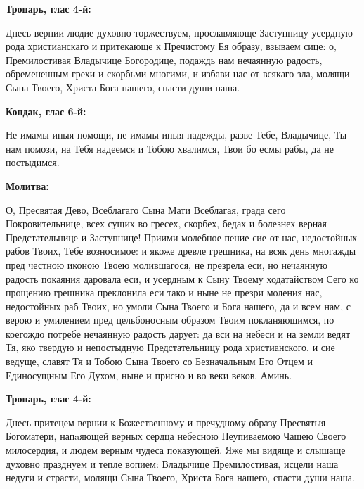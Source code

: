 \bigskip\bigskip\mychapterending

 


\bfseries Тропарь, глас 4-й\normalfont{}:


Днесь вернии людие духовно торжествуем, прославляюще Заступницу усердную рода христианскаго и притекающе к Пречистому Ея образу, взываем сице: о, Премилостивая Владычице Богородице, подаждь нам нечаянную радость, обремененным грехи и скорбьми многими, и избави нас от всякаго зла, молящи Сына Твоего, Христа Бога нашего, спасти души наша.


\medskip


\bfseries Кондак, глас 6-й\normalfont{}:


Не имамы иныя помощи, не имамы иныя надежды, разве Тебе, Владычице, Ты нам помози, на Тебя надеемся и Тобою хвалимся, Твои бо есмы рабы, да не постыдимся.


\medskip


\bfseries Молитва\normalfont{}:


О, Пресвятая Дево, Всеблагаго Сына Мати Всеблагая, града сего Покровительнице, всех сущих во гресех, скорбех, бедах и болезнех верная Предстательнице и Заступнице! Приими молебное пение сие от нас, недостойных рабов Твоих, Тебе возносимое: и якоже древле грешника, на всяк день многажды пред честною иконою Твоею молившагося, не презрела еси, но нечаянную радость покаяния даровала еси, и усердным к Сыну Твоему ходатайством Сего ко прощению грешника преклонила еси тако и ныне не презри моления нас, недостойных раб Твоих, но умоли Сына Твоего и Бога нашего, да и всем нам, с верою и умилением пред цельбоносным образом Твоим покланяющимся, по коегождо потребе нечаянную радость дарует: да вси на небеси и на земли ведят Тя, яко твердую и непостыдную Предстательницу рода христианского, и сие ведуще, славят Тя и Тобою Сына Твоего со Безначальным Его Отцем и Единосущным Его Духом, ныне и присно и во веки веков. Аминь.


\bigskip\bigskip\mychapterending

 
\vspace{-\baselineskip}

\bfseries Тропарь, глас 4-й:\normalfont{}\nopagebreak


Днесь притецем вернии к Божественному и пречудному образу Пресвятыя Богоматери, напaяющей верных сердца небесною Неупиваемою Чашею Своего милосердия, и людем верным чудеса показующей. Яже мы видяще и слышаще духовно празднуем и тепле вопием: Владычице Премилостивая, исцели наша недуги и страсти, молящи Сына Твоего, Христа Бога нашего, спасти души наша.


